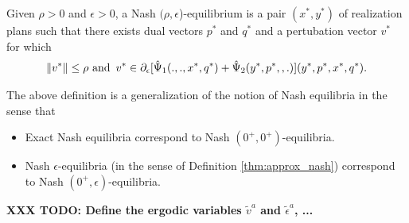 \documentclass[envcountsame]{llcns2e/llncs}
\begin{document}

\begin{definition}
Given $\rho > 0$ and $\epsilon > 0$, a Nash
$(\rho,\epsilon$)-equilibrium is a pair $(x^*, y^*)$ of realization
plans such that there exists dual vectors $p^*$ and $q^*$ and a
pertubation vector $v^*$ for which
\begin{eqnarray}
\|v^*\| \le \rho \text{ and}\hspace{.5em} v^* \in
\partial_\epsilon[\hat{\Psi}_1(., ., x^*, q^*) +
  \hat{\Psi}_2(y^*, p^*, , .)](y^*,p^*,x^*,q^*).
\end{eqnarray}
\end{definition}

The above definition is a generalization of the notion of Nash
equilibria in the sense that
\begin{itemize}
\item Exact Nash equilibria correspond to Nash $(0^+,0^+)$-equilibria.
\item Nash $\epsilon$-equilibria (in the sense of Definition
  \ref{thm:approx_nash}) correspond to Nash $(0^+,\epsilon)$-equilibria.
\end{itemize}

\textbf{XXX TODO: Define the ergodic variables $\tilde{v}^a$ and
  $\tilde{\epsilon}^a$, ...}
\end{document}
